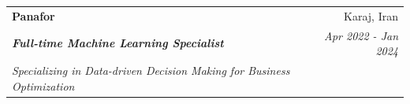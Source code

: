 \documentclass[letterpaper,11pt]{article}
\makeatletter
\newcommand{\resumeSubheading}[5]{
  \item
    \begin{tabular*}{0.97\textwidth}{l@{\extracolsep{\fill}}r}
      \textbf{#1} & #2 \\ 
      \textit{\small#3} & \textit{\small #4} \\
      \textit{#5} & 
    \end{tabular*}\vspace{-5pt}
}
\makeatother
\begin{document}
    \resumeSubheading
      {Panafor}{Karaj, Iran}
       {\textbf{Full-time Machine Learning Specialist}}
      {Apr 2022 - Jan 2024}{Specializing in Data-driven Decision Making for Business Optimization}
     
\end{document}

